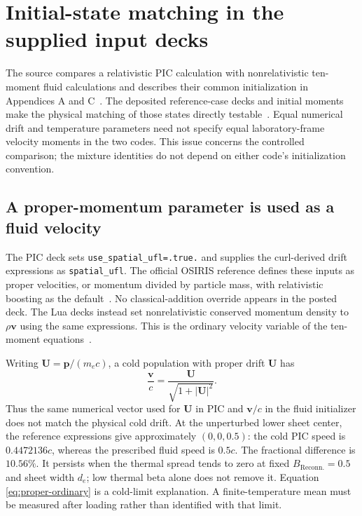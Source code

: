 \section{Initial-state matching in the supplied input decks}
\label{sec:initialization}

The source compares a relativistic PIC calculation with nonrelativistic
ten-moment fluid calculations and describes their common initialization in
Appendices A and C~\cite{original}. The deposited reference-case decks and
initial moments make the physical matching of those states directly
testable~\cite{dataset}. Equal numerical drift and temperature parameters
need not specify equal laboratory-frame velocity moments in the two codes.
This issue concerns the controlled comparison; the mixture identities do
not depend on either code's initialization convention.

\subsection{A proper-momentum parameter is used as a fluid velocity}
The PIC deck sets \texttt{use\_spatial\_ufl=.true.} and supplies the curl-derived
drift expressions as \texttt{spatial\_ufl}. The official OSIRIS reference
defines these inputs as proper velocities, or momentum divided by particle
mass, with relativistic boosting as the default~\cite{osirisudist}.
No classical-addition override appears in the posted deck. The Lua decks
instead set nonrelativistic conserved momentum density to $\rho\mathbf v$
using the same expressions. This is the ordinary velocity variable of the
ten-moment equations~\cite{wang2015}.

Writing $\mathbf U=\mathbf p/(m_ec)$, a cold population with proper drift
$\mathbf U$ has
\begin{equation}
 \frac{\mathbf v}{c}=\frac{\mathbf U}{\sqrt{1+|\mathbf U|^2}}.
 \label{eq:proper-ordinary}
\end{equation}
Thus the same numerical vector used for $\mathbf U$ in PIC and $\mathbf v/c$
in the fluid initializer does not match the physical cold drift. At the
unperturbed lower sheet center, the reference expressions give approximately
$(0,0,0.5)$: the cold PIC speed is $0.4472136c$, whereas the prescribed fluid
speed is $0.5c$. The fractional difference is $10.56\%$. It persists when
the thermal spread tends to zero at fixed $B_{\mathrm{Reconn.}}=0.5$ and sheet
width $d_e$; low thermal beta alone does not remove it. Equation
\eqref{eq:proper-ordinary} is a cold-limit explanation. A finite-temperature
mean must be measured after loading rather than identified with that limit.

